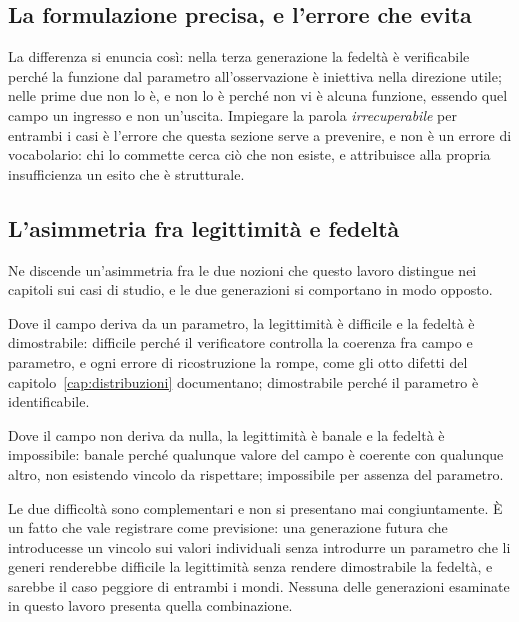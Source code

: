 \subsection*{La formulazione precisa, e l'errore che evita}

La differenza si enuncia così: nella terza generazione la fedeltà è verificabile perché la funzione dal parametro all'osservazione è iniettiva nella direzione utile; nelle prime due non lo è, e non lo è perché non vi è alcuna funzione, essendo quel campo un ingresso e non un'uscita. Impiegare la parola \emph{irrecuperabile} per entrambi i casi è l'errore che questa sezione serve a prevenire, e non è un errore di vocabolario: chi lo commette cerca ciò che non esiste, e attribuisce alla propria insufficienza un esito che è strutturale.

\subsection*{L'asimmetria fra legittimità e fedeltà}

Ne discende un'asimmetria fra le due nozioni che questo lavoro distingue nei capitoli sui casi di studio, e le due generazioni si comportano in modo opposto.

Dove il campo deriva da un parametro, la legittimità è difficile e la fedeltà è dimostrabile: difficile perché il verificatore controlla la coerenza fra campo e parametro, e ogni errore di ricostruzione la rompe, come gli otto difetti del capitolo~\ref{cap:distribuzioni} documentano; dimostrabile perché il parametro è identificabile.

Dove il campo non deriva da nulla, la legittimità è banale e la fedeltà è impossibile: banale perché qualunque valore del campo è coerente con qualunque altro, non esistendo vincolo da rispettare; impossibile per assenza del parametro.

Le due difficoltà sono complementari e non si presentano mai congiuntamente. È un fatto che vale registrare come previsione: una generazione futura che introducesse un vincolo sui valori individuali senza introdurre un parametro che li generi renderebbe difficile la legittimità senza rendere dimostrabile la fedeltà, e sarebbe il caso peggiore di entrambi i mondi. Nessuna delle generazioni esaminate in questo lavoro presenta quella combinazione.
